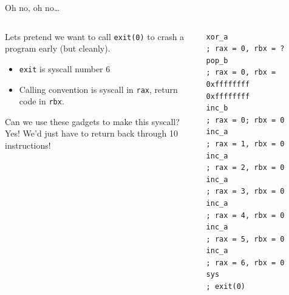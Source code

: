 \documentclass[9pt,aspectratio=169]{beamer}
\begin{document}
\begin{frame}[label={sec:org0144f1f},fragile]{Oh no, oh no\ldots{}}
 \begin{columns}
\begin{column}[t]{0.49\columnwidth}
Lets pretend we want to call \texttt{exit(0)} to crash a program early (but cleanly).
\begin{itemize}
\item \texttt{exit} is syscall number 6
\item Calling convention is syscall in \texttt{rax}, return code in \texttt{rbx}.
\end{itemize}

\begin{block}{Can we use these gadgets to make this syscall?}
Yes! We'd just have to return back through 10 instructions!
\end{block}
\end{column}
\begin{column}[t]{0.49\columnwidth}
\begin{verbatim}
xor_a                   ; rax = 0, rbx = ?
pop_b                   ; rax = 0, rbx = 0xffffffff
0xffffffff
inc_b                   ; rax = 0; rbx = 0
inc_a                   ; rax = 1, rbx = 0
inc_a                   ; rax = 2, rbx = 0
inc_a                   ; rax = 3, rbx = 0
inc_a                   ; rax = 4, rbx = 0
inc_a                   ; rax = 5, rbx = 0
inc_a                   ; rax = 6, rbx = 0
sys                     ; exit(0)
\end{verbatim}
\end{column}
\end{columns}
\end{frame}
\end{document}
